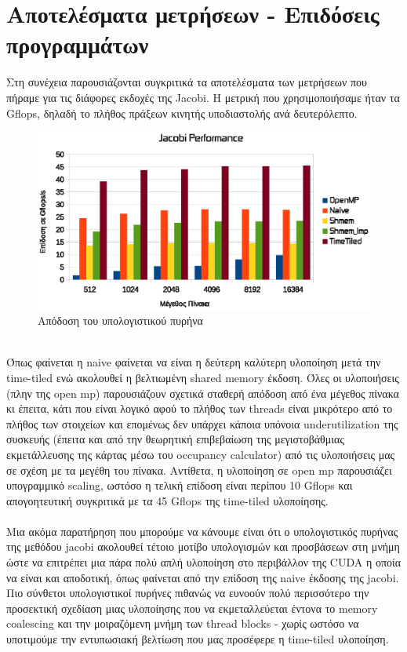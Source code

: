 \documentclass[11pt,a4paper]{article}
\begin{document}
\section{Αποτελέσματα μετρήσεων - Επιδόσεις προγραμμάτων}
Στη συνέχεια παρουσιάζονται συγκριτικά τα αποτελέσματα των μετρήσεων που πήραμε για τις διάφορες εκδοχές της Jacobi. Η μετρική που χρησιμοποιήσαμε ήταν τα Gflops, δηλαδή το πλήθος πράξεων κινητής υποδιαστολής ανά δευτερόλεπτο. \\
\begin{figure}[h]
	\centering
	\includegraphics[width=\textwidth]{jacobi.eps}
	\caption{Απόδοση του υπολογιστικού πυρήνα}
\end{figure} \\
Όπως φαίνεται η naive φαίνεται να είναι η δεύτερη καλύτερη υλοποίηση μετά την time-tiled ενώ ακολουθεί η βελτιωμένη shared memory έκδοση. Όλες οι υλοποιήσεις (πλην της open mp) παρουσιάζουν σχετικά σταθερή απόδοση από ένα μέγεθος πίνακα κι έπειτα, κάτι που είναι λογικό αφού το πλήθος των threads είναι μικρότερο από το πλήθος των στοιχείων και επομένως δεν υπάρχει κάποια υπόνοια underutilization της συσκευής (έπειτα και από την θεωρητική επιβεβαίωση της μεγιστοβάθμιας εκμετάλλευσης της κάρτας μέσω του occupancy calculator) από τις υλοποιήσεις μας σε σχέση με τα μεγέθη του πίνακα. Αντίθετα, η υλοποίηση σε open mp παρουσιάζει υπογραμμικό scaling, ωστόσο η τελική επίδοση είναι περίπου 10 Gflops και απογοητευτική συγκριτικά με τα 45 Gflops της time-tiled υλοποίησης. \\ \\
Μια ακόμα παρατήρηση που μπορούμε να κάνουμε είναι ότι ο υπολογιστικός πυρήνας της μεθόδου jacobi ακολουθεί τέτοιο μοτίβο υπολογισμών και προσβάσεων στη μνήμη ώστε να επιτρέπει μια πάρα πολύ απλή υλοποίηση στο περιβάλλον της CUDA η οποία να είναι και αποδοτική, όπως φαίνεται από την επίδοση της naive έκδοσης της jacobi. Πιο σύνθετοι υπολογιστικοί πυρήνες πιθανώς να ευνοούν πολύ περισσότερο την προσεκτική σχεδίαση μιας υλοποίησης που να εκμεταλλεύεται έντονα το memory coalescing και την μοιραζόμενη μνήμη των thread blocks - χωρίς ωστόσο να υποτιμούμε την εντυπωσιακή βελτίωση που μας προσέφερε η time-tiled υλοποίηση. \\
\end{document}
